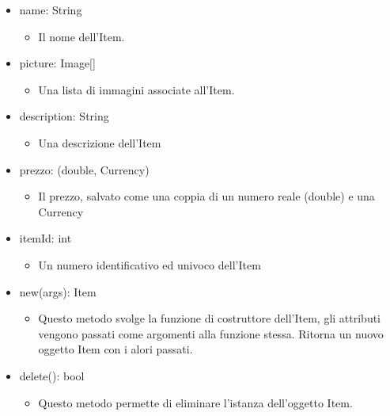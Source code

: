\documentclass{report}
\begin{document}
\begin{itemize}

\item name: String
\begin{itemize}
	\item Il nome dell'Item.
\end{itemize}

\item picture: Image[]
\begin{itemize}
	\item Una lista di immagini associate all'Item.
\end{itemize}

\item description: String
\begin{itemize}
	\item Una descrizione dell'Item
\end{itemize}

\item prezzo: (double, Currency)
\begin{itemize}
	\item Il prezzo, salvato come una coppia di un numero reale (double) e una Currency
\end{itemize}

\item  itemId: int
\begin{itemize}
	\item Un numero identificativo ed univoco dell'Item
\end{itemize}

\item  new(args): Item
\begin{itemize}
	\item Questo metodo svolge la funzione di costruttore dell'Item, gli attributi vengono passati come argomenti alla funzione stessa. Ritorna un nuovo oggetto Item con i alori passati.
\end{itemize}

\item  delete(): bool
\begin{itemize}
	\item Questo metodo permette di eliminare l'istanza dell'oggetto Item.
\end{itemize}

\end{itemize}
\end{document}
